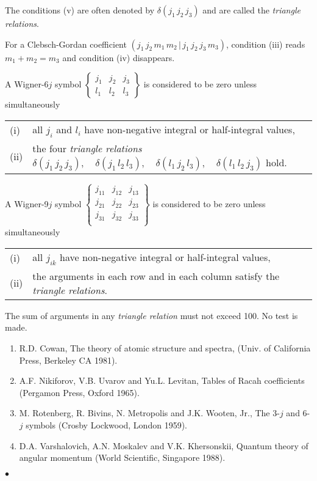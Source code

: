 \par
The conditions (v) are often denoted by $\delta(j_1\,j_2\,j_3)$ and
are called the {\it triangle relations}.
\par
For a Clebsch-Gordan coefficient
$(j_1\,j_2\,m_1\,m_2\,|\,j_1\,j_2\,j_3\,m_3)$,
condition (iii) reads $m_1+m_2=m_3$ and condition (iv) disappears.
\par
A Wigner-6$j$ symbol $\displaystyle \left\{\begin{array}{ccc}
j_1 & j_2 & j_3 \\ l_1 & l_2 & l_3 \end{array}\right\}$
is considered to be zero unless simultaneously \\
\begin{tabular}[t]{ll}
(i) & all $j_i$ and $l_i$ have non-negative integral or
half-integral values, \\
(ii) & the four {\it triangle relations} \quad
$\delta(j_1\,j_2\,j_3), \quad \delta(j_1\,l_2\,l_3), \quad
 \delta(l_1\,j_2\,l_3), \quad \delta(l_1\,l_2\,j_3)$ \quad hold.
\end{tabular}
\par
A Wigner-9$j$ symbol $\displaystyle \left\{\begin{array}{ccc}
j_{11} & j_{12} & j_{13} \\ j_{21} & j_{22} & j_{23} \\
j_{31} & j_{32} & j_{33} \\
\end{array}\right\}$
is considered to be zero unless simultaneously \\
\begin{tabular}[t]{ll}
(i) & all $j_{ik}$ have non-negative integral or half-integral
values,\\
(ii) & the arguments in each row and in each column satisfy the
{\it triangle relations}.
\end{tabular}
\Restrict
The sum of arguments in any {\it triangle relation} must not exceed 100.
No test is made.
\Refer
\begin{enumerate}
\item R.D. Cowan, The theory of atomic structure and spectra,
(Univ. of California Press, Berkeley CA 1981).
\item A.F. Nikiforov, V.B. Uvarov and Yu.L. Levitan, Tables of Racah
coefficients (Pergamon Press, Oxford 1965).
\item M. Rotenberg, R. Bivins, N. Metropolis and J.K. Wooten, Jr.,
The 3-$j$ and 6-$j$ symbols (Crosby Lockwood, London 1959).
\item D.A. Varshalovich, A.N. Moskalev and V.K. Khersonskii,
Quantum theory of angular momentum (World Scientific, Singapore 1988).
\end{enumerate}
$\bullet$
